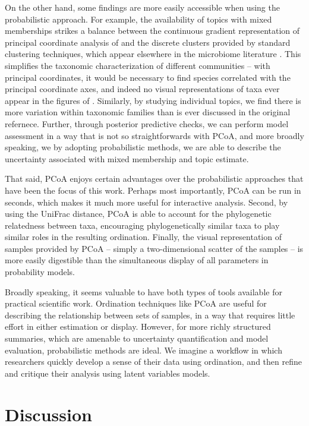 \documentclass{article}
\begin{document}
On the other hand, some findings are more easily accessible when using the
probabilistic approach. For example, the availability of topics with mixed
memberships strikes a balance between the continuous gradient representation of
principal coordinate analysis of \citep{dethlefsen2011incomplete} and the
discrete clusters provided by standard clustering techniques, which appear
elsewhere in the microbiome literature \citep{digiulio2015temporal,
  mcmurdie2014waste}. This simplifies the taxonomic characterization of
different communities -- with principal coordinates, it would be necessary to
find species correlated with the principal coordinate axes, and indeed no visual
representations of taxa ever appear in the figures of
\cite{dethlefsen2011incomplete}. Similarly, by studying individual topics, we
find there is more variation within taxonomic families than is ever discussed in
the original refernece. Further, through posterior predictive checks, we can
perform model assessment in a way that is not so straightforwards with PCoA, and
more broadly speaking, we by adopting probabilistic methods, we are able to
describe the uncertainty associated with mixed membership and topic estimate.

That said, PCoA enjoys certain advantages over the probabilistic approaches that
have been the focus of this work. Perhaps most importantly, PCoA can be run in
seconds, which makes it much more useful for interactive analysis. Second, by
using the UniFrac distance, PCoA is able to account for the phylogenetic
relatedness between taxa, encouraging phylogenetically similar taxa to play
similar roles in the resulting ordination. Finally, the visual representation of
samples provided by PCoA -- simply a two-dimensional scatter of the samples --
is more easily digestible than the simultaneous display of all parameters in
probability models.

Broadly speaking, it seems valuable to have both types of tools available for
practical scientific work. Ordination techniques like PCoA are useful for
describing the relationship between sets of samples, in a way that requires
little effort in either estimation or display. However, for more richly
structured summaries, which are amenable to uncertainty quantification and model
evaluation, probabilistic methods are ideal. We imagine a workflow in which
researchers quickly develop a sense of their data using ordination, and then
refine and critique their analysis using latent variables models.

\section{Discussion}
\end{document}
